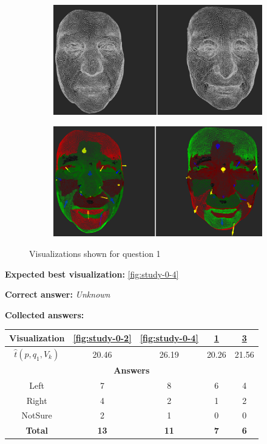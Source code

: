 \begin{figure}[h]
\begin{subfigure}{0.49\textwidth}
\includegraphics[width=\textwidth]{./screenshots/pair1.PNG}
\caption{}
\label{fig:study-0-1}
\end{subfigure}
\begin{subfigure}{0.49\textwidth}
\includegraphics[width=\textwidth]{./screenshots/pair3.PNG}
\caption{}
\label{fig:study-0-3}
\end{subfigure}
\caption{Visualizations shown for question 1}
\end{figure}
\medskip

{\bf Expected best visualization:} \ref{fig:study-0-4}
\medskip

{\bf Correct answer:} {\it Unknown}
\medskip

{\bf Collected answers:}

\begin{center}
\begin{tabular}{| c | c | c | c | c |}
	\hline
	Visualization & \ref{fig:study-0-2} & \ref{fig:study-0-4} & \ref{fig:study-0-1} & \ref{fig:study-0-3}\\ \hline
	\(\widehat{t}(p, q_1, V_k)\) & 20.46 & 26.19 & 20.26 & 21.56\\ \hline
	\multicolumn{5}{|c|}{\bf Answers} \\ \hline
	Left & 7 & 8 & 6 & 4\\ \hline
	Right & 4 & 2 & 1 & 2\\ \hline
	NotSure & 2 & 1 & 0 & 0\\ \hline
	{\bf Total} & {\bf 13} & {\bf 11} & {\bf 7} & {\bf 6}\\ \hline
\end{tabular}
\end{center}
\clearpage

